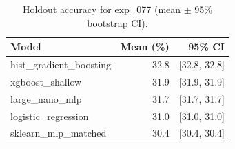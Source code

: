\begin{table}[ht]
\centering
\caption{Holdout accuracy for exp_077 (mean $\pm$ 95\% bootstrap CI).}
\label{tab:exp_077}
\begin{tabular}{lrr}
\toprule
Model & Mean (\%) & 95\% CI \\
\midrule
hist\_gradient\_boosting & 32.8 & [32.8, 32.8] \\
xgboost\_shallow & 31.9 & [31.9, 31.9] \\
large\_nano\_mlp & 31.7 & [31.7, 31.7] \\
logistic\_regression & 31.0 & [31.0, 31.0] \\
sklearn\_mlp\_matched & 30.4 & [30.4, 30.4] \\
\bottomrule
\end{tabular}
\end{table}
